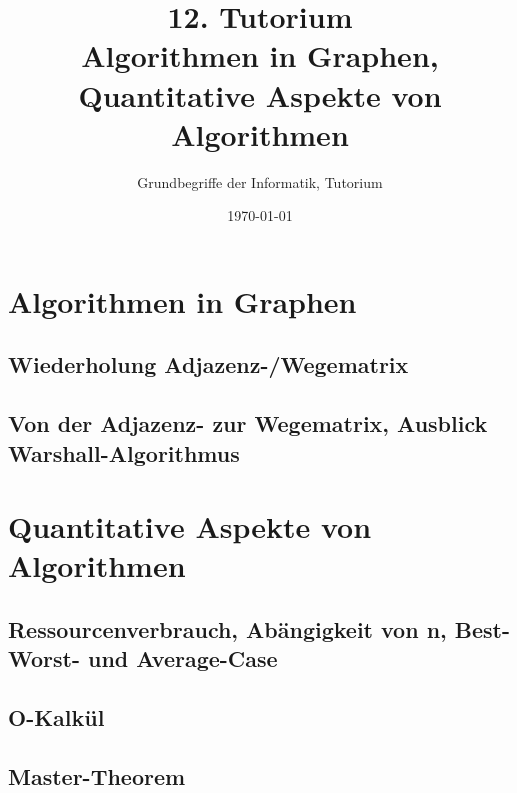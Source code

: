 




\title[Algorithmen in Graphen, Quantitative Aspekte von Algorithmen]{12. Tutorium\\ Algorithmen in Graphen, \\Quantitative Aspekte von Algorithmen}
\subtitle{Grundbegriffe der Informatik, Tutorium \hashtag\mytutnumber}
\date{\today}



\titleframe
\roadmap

\section{Algorithmen in Graphen}
\subsection{Wiederholung Adjazenz-/Wegematrix}

\subsection{Von der Adjazenz- zur Wegematrix, Ausblick Warshall-Algorithmus}



\section{Quantitative Aspekte von Algorithmen}
\newcommand{\Rplus}{\ensuremath{\nR_+}}
\newcommand{\Rnullplus}{\ensuremath{\nR^+_0}}
\subsection{Ressourcenverbrauch, Abängigkeit von n, Best- Worst- und Average-Case}

\subsection{O-Kalkül}

\subsection{Master-Theorem}



